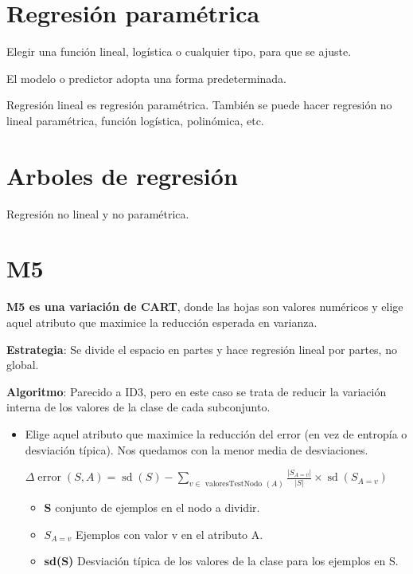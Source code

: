 \documentclass[12pt]{report} %
\begin{document}
\section{Regresión paramétrica}

Elegir una función lineal, logística o cualquier tipo, para que se
ajuste.

El modelo o predictor adopta una forma predeterminada.

Regresión lineal es regresión paramétrica. También se puede hacer
regresión no lineal paramétrica, función logística, polinómica, etc.

\section{Arboles de regresión}

Regresión no lineal y no paramétrica.

\section{M5}

\textbf{M5 es una variación de CART}, donde las hojas son valores numéricos y
elige aquel atributo que maximice la reducción esperada en varianza.

\textbf{Estrategia}: Se divide el espacio en partes y hace regresión
lineal por partes, no global.

\textbf{Algoritmo}: Parecido a ID3, pero en este caso se trata de
reducir la variación interna de los valores de la clase de cada
subconjunto.

\begin{itemize}
\item
  Elige aquel atributo que maximice la reducción del error (en vez de
  entropía o desviación típica). Nos quedamos con la menor media de
  desviaciones.

  \(\Delta \operatorname{error}(S, A)=\operatorname{sd}(S)-\sum_{v \in \text { valoresTestNodo }(A)} \frac{\left|S_{A=v}\right|}{|S|} \times \operatorname{sd}\left(S_{A=v}\right)\)

  \begin{itemize}
  
  \item
    \textbf{S} conjunto de ejemplos en el nodo a dividir.
  \item
    \textbf{\(S_{A=v}\)} Ejemplos con valor v en el atributo A.
  \item
    \textbf{sd(S)} Desviación típica de los valores de la clase para los
    ejemplos en S.
  \end{itemize}
\end{itemize}
\end{document}
